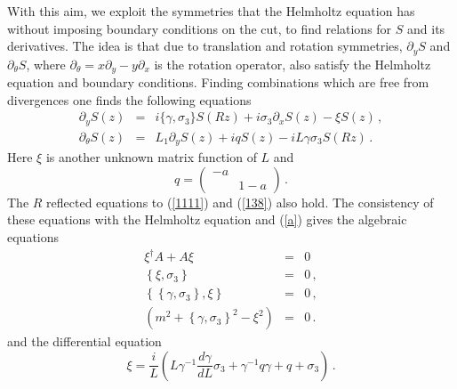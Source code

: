 \documentclass[11pt]{article}
\begin{document}
With this aim, we exploit the symmetries that the Helmholtz equation has without imposing boundary conditions on the cut, to find relations for $S$ and its derivatives. The idea is that due to translation and rotation symmetries, $\partial_y S$ and $\partial_\theta S$, where $\partial _{\theta }=x\partial
_{y}-y\partial _{x}$ is the rotation operator, also satisfy the Helmholtz equation and boundary conditions. Finding combinations which are free from divergences one finds the following equations 
 \begin{eqnarray}
 \partial_y S(z)&=& i\{\gamma,\sigma_3\} S(Rz)+i \sigma_3 \partial_x S(z)- \xi S(z)\,,\label{1111}\\
\partial _{\theta} S(z)&=&L_1\partial_{y} S(z)+iqS(z)-iL\gamma
\sigma _{3}S(Rz) \label{138} \,.
\end{eqnarray}
Here $\xi$ is another unknown matrix function of $L$ and 
\begin{equation}
q=\left(
\begin{array}{ll}
-a &  \\
& 1-a
\end{array}
\right)\,.
\end{equation}
The $R$ reflected equations to (\ref{1111}) and (\ref{138}) also hold. The consistency of these equations with the Helmholtz equation and (\ref{a}) gives the algebraic equations
\begin{eqnarray}
\xi^{\dagger}A+A\xi&=&0
\label{132}\,\\
\left\{ \xi ,\sigma _{3}\right\} &=&0 \,,\label{133}\\
\left\{ \left\{ \gamma ,\sigma _{3}\right\} ,\xi \right\} &=&0\,, \label{134}\\
\left( m^{2}+\left\{ \gamma ,\sigma _{3}\right\} ^{2}-\xi ^{2}\right) &=&0\,.\label{135}
\end{eqnarray}
and the differential equation
\begin{equation}
\xi =\frac{i}{L}\left( L\gamma ^{-1}\frac{d\gamma }{dL}\sigma _{3}+\gamma
^{-1}q\gamma +q+\sigma _{3}\right) \,. \label{eku}
\end{equation}
\end{document}
